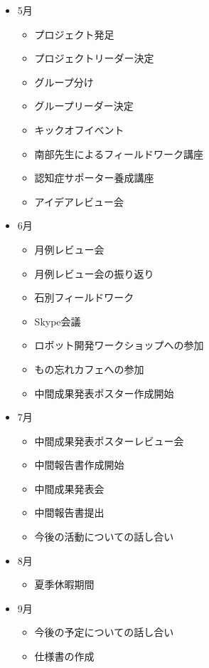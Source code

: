 \documentclass[../report]{subfiles}
\begin{document}
\begin{itemize}
    \item[] 5月
    \begin{itemize}
        \item プロジェクト発足
        \item プロジェクトリーダー決定
        \item グループ分け
        \item グループリーダー決定
        \item キックオフイベント
        \item 南部先生によるフィールドワーク講座
        \item 認知症サポーター養成講座
        \item アイデアレビュー会
    \end{itemize}
    \item[] 6月
    \begin{itemize}
        \item 月例レビュー会
        \item 月例レビュー会の振り返り
        \item 石別フィールドワーク
        \item Skype会議
        \item ロボット開発ワークショップへの参加
        \item もの忘れカフェへの参加
        \item 中間成果発表ポスター作成開始
    \end{itemize}
    \item[] 7月
    \begin{itemize}
        \item 中間成果発表ポスターレビュー会
        \item 中間報告書作成開始
        \item 中間成果発表会
        \item 中間報告書提出
        \item 今後の活動についての話し合い
    \end{itemize}
    \item[] 8月
    \begin{itemize}
        \item 夏季休暇期間
    \end{itemize}
    \item[] 9月
    \begin{itemize}
        \item 今後の予定についての話し合い
        \item 仕様書の作成

\end{itemize}
\end{itemize}
\end{document}
